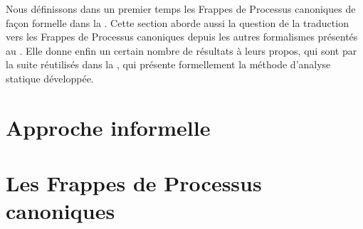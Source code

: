 Nous définissons dans un premier temps les Frappes de Processus canoniques
de façon formelle dans la .
Cette section aborde aussi la question de la traduction vers les Frappes de Processus canoniques
depuis les autres formalismes présentés au .
Elle donne enfin un certain nombre de résultats à leurs propos,
qui sont par la suite réutilisés dans la ,
qui présente formellement la méthode d'analyse statique développée.



\section{Approche informelle}
\TODO


\section{Les Frappes de Processus canoniques}
  
  




